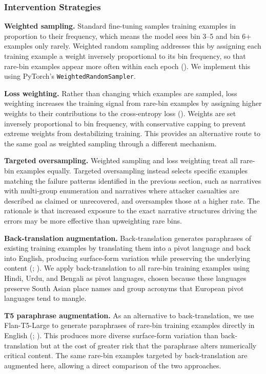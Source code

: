 \documentclass[
  11pt,
]{article}
\begin{document}
\subsubsection{Intervention Strategies}\label{intervention-strategies}

\textbf{Weighted sampling.} Standard fine-tuning samples training
examples in proportion to their frequency, which means the model sees
bin 3--5 and bin 6+ examples only rarely. Weighted random sampling
addresses this by assigning each training example a weight inversely
proportional to its bin frequency, so that rare-bin examples appear more
often within each epoch (). We implement this using PyTorch's
\texttt{WeightedRandomSampler}.

\textbf{Loss weighting.} Rather than changing which examples are
sampled, loss weighting increases the training signal from rare-bin
examples by assigning higher weights to their contributions to the
cross-entropy loss (). Weights
are set inversely proportional to bin frequency, with conservative
capping to prevent extreme weights from destabilizing training. This
provides an alternative route to the same goal as weighted sampling
through a different mechanism.

\textbf{Targeted oversampling.} Weighted sampling and loss weighting
treat all rare-bin examples equally. Targeted oversampling instead
selects specific examples matching the failure patterns identified in
the previous section, such as narratives with multi-group enumeration
and narratives where attacker casualties are described as claimed or
unrecovered, and oversamples those at a higher rate. The rationale is
that increased exposure to the exact narrative structures driving the
errors may be more effective than upweighting rare bins.

\textbf{Back-translation augmentation.} Back-translation generates
paraphrases of existing training examples by translating them into a
pivot language and back into English, producing surface-form variation
while preserving the underlying content
(;
). We apply back-translation
to all rare-bin training examples using Hindi, Urdu, and Bengali as
pivot languages, chosen because these languages preserve South Asian
place names and group acronyms that European pivot languages tend to
mangle.

\textbf{T5 paraphrase augmentation.} As an alternative to
back-translation, we use Flan-T5-Large to generate paraphrases of
rare-bin training examples directly in English
(;
). This produces more
diverse surface-form variation than back-translation but at the cost of
greater risk that the paraphrase alters numerically critical content.
The same rare-bin examples targeted by back-translation are augmented
here, allowing a direct comparison of the two approaches.
\end{document}

